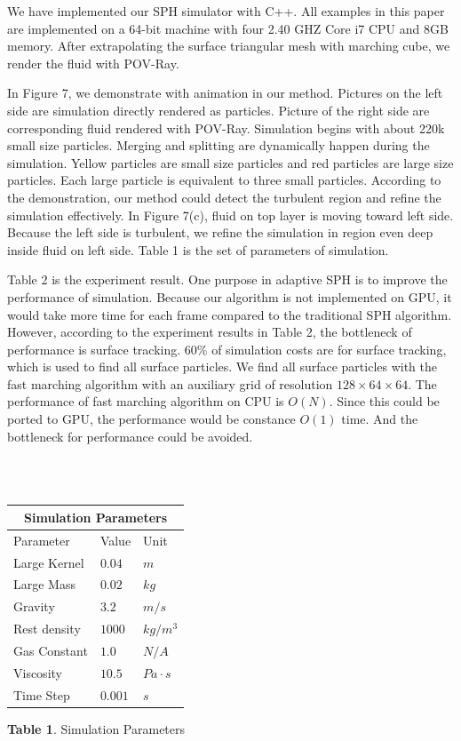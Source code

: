 We have implemented our SPH simulator with C++. All examples in this paper are implemented on a 64-bit machine with four 2.40 GHZ Core i7 CPU and 8GB memory.
After extrapolating the surface triangular mesh with marching cube, we render the fluid with POV-Ray.

In Figure 7, we demonstrate with animation in our method. Pictures on the left side are simulation directly rendered as particles.
Picture of the right side are corresponding fluid rendered with POV-Ray. Simulation begins with about 220k small size particles. Merging and splitting
are dynamically happen during the simulation. Yellow particles are small size particles and red particles are large size particles. Each large particle
is equivalent to three small particles. According to the demonstration, our method could detect the turbulent region and refine the simulation effectively.
In Figure 7(c), fluid on top layer is moving toward left side. Because the left side is turbulent, we refine the simulation in region even deep inside fluid on left side.
Table 1 is the set of parameters of simulation.

Table 2 is the experiment result. One purpose in adaptive SPH is to improve the performance of simulation. Because our algorithm is not implemented on GPU,
it would take more time for each frame compared to the traditional SPH algorithm. However, according to the experiment results in Table 2, the bottleneck of
performance is surface tracking. $60\%$ of simulation costs are for surface tracking, which is used to find all surface particles.
 We find all surface particles with the fast marching algorithm with an auxiliary grid of resolution $128 \times 64 \times 64$. The
performance of fast marching algorithm on CPU is $O(N)$. Since this could be ported to GPU, the performance would be constance $O(1)$ time. And the bottleneck for performance could be
avoided.

~\\
~\\
\begin{center}
    \begin{tabular}{ | l | l | l |}
    \hline
    \multicolumn{3}{|c|}{Simulation Parameters} \\
    \hline
    Parameter & Value & Unit \\ \hline
    Large Kernel & $0.04$ & $m$ \\ \hline
    Large Mass & $0.02$ & $kg$ \\ \hline
    Gravity & $3.2$ & $m/s$ \\ \hline
    Rest density  & $1000$ & $kg/m^3$ \\ \hline
    Gas Constant  & $1.0$ & $N/A$ \\ \hline
    Viscosity  & $10.5$ & $Pa \cdot s$ \\ \hline
    Time Step & $0.001$ & $s$ \\ \hline
    \end{tabular}

    \textbf{Table 1}. Simulation Parameters
\end{center}

